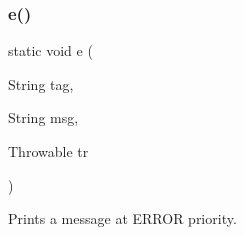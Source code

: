 \subsubsection{\texorpdfstring{e()}{e()}\hspace{0.1cm}{\footnotesize\ttfamily [1/2]}}
{\footnotesize\ttfamily static void e (\begin{DoxyParamCaption}\item[{String}]{tag,  }\item[{String}]{msg,  }\item[{Throwable}]{tr }\end{DoxyParamCaption})\hspace{0.3cm}{\ttfamily [static]}}



Prints a message at E\+R\+R\+OR priority. 


